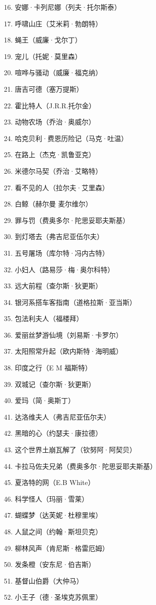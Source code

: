 \documentclass[UTF8]{../RepresentationUniverse}
\begin{document}
16. 安娜·卡列尼娜（列夫·托尔斯泰）

17. 呼啸山庄（艾米莉·勃朗特）

18. 蝇王（威廉·戈尔丁）

19. 宠儿（托妮·莫里森）

20. 喧哗与骚动（威廉·福克纳）

21. 唐吉可德（塞万提斯）

22. 霍比特人（J.R.R.托尔金）

23. 动物农场（乔治·奥威尔）

24. 哈克贝利·费恩历险记（马克·吐温）

25. 在路上（杰克·凯鲁亚克）

26. 米德尔马契（乔治·艾略特）

27. 看不见的人（拉尔夫·艾里森）

28. 白鲸（赫尔曼 麦尔维尔）

29. 罪与罚（费奥多尔·陀思妥耶夫斯基）

30. 到灯塔去（弗吉尼亚伍尔夫）

31. 五号屠场（库尔特·冯内古特）

32. 小妇人（路易莎·梅·奥尔科特）

33. 远大前程（查尔斯·狄更斯）

34. 银河系搭车客指南（道格拉斯·亚当斯）

35. 包法利夫人（福楼拜）

36. 爱丽丝梦游仙境（刘易斯·卡罗尔）

37. 太阳照常升起（欧内斯特·海明威）

38. 印度之行（E M 福斯特）

39. 双城记（查尔斯·狄更斯）

40. 爱玛（简·奥斯丁）

41. 达洛维夫人（弗吉尼亚伍尔夫）

42. 黑暗的心（约瑟夫·康拉德）

43. 这个世界土崩瓦解了（钦努阿·阿契贝）

44. 卡拉马佐夫兄弟（费奥多尔·陀思妥耶夫斯基）

45. 夏洛特的网（E.B White）

46. 科学怪人（玛丽·雪莱）

47. 蝴蝶梦（达芙妮·杜穆里埃）

48. 人鼠之间（约翰·斯坦贝克）

49. 柳林风声（肯尼斯·格雷厄姆）

50. 发条橙（安东尼·伯吉斯）

51. 基督山伯爵（大仲马）

52. 小王子（德·圣埃克苏佩里）
\end{document}
